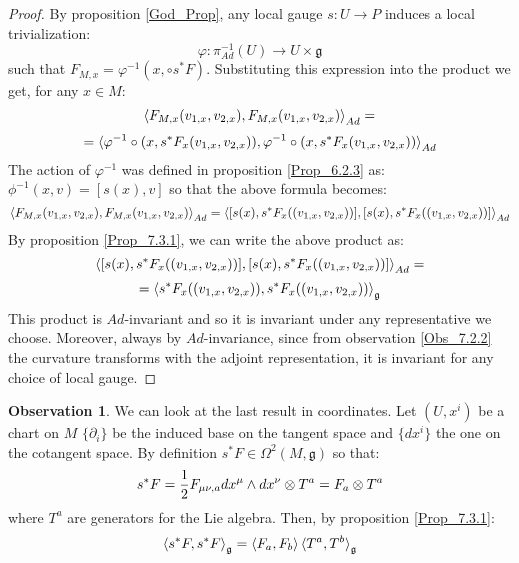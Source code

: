 \documentclass[12pt,a4paper]{report}
\theoremstyle{definition}
\theoremstyle{Theorem}
\theoremstyle{definition}
\theoremstyle{definition}
\newtheorem{Obs}[Def]{Observation}
\begin{document}
	\begin{proof}
		By proposition \ref{God_Prop}, any local gauge $s:U\rightarrow P$ induces a local trivialization:
		$$\varphi: \pi^{-1}_{Ad}(U)\rightarrow U\times \mathfrak{g}$$
		such that $F_{M,x}=\varphi^{-1}(x,\circ s^*F)$.
		Substituting this expression into the product we get, for any $x\in M$:
		$$\braket{F_{M,x}(v_{1,x},v_{2,x}),F_{M,x}(v_{1,x},v_{2,x})}_{Ad}=$$
		$$=\braket{\varphi^{-1}\circ (x,s^*F_x(v_{1,x},v_{2,x})),\varphi^{-1}\circ (x,s^*F_x(v_{1,x},v_{2,x}))}_{Ad}$$
		The action of $\varphi^{-1}$ was defined in proposition \ref{Prop_6.2.3} as: $\phi^{-1}(x,v)=[s(x),v]$ so that the above formula becomes:
		$$\braket{F_{M,x}(v_{1,x},v_{2,x}),F_{M,x}(v_{1,x},v_{2,x})}_{Ad}=\braket{[s(x),s^*F_x((v_{1,x},v_{2,x}))],[s(x),s^*F_x((v_{1,x},v_{2,x}))]}_{Ad}$$
		By proposition \ref{Prop_7.3.1}, we can write the above product as:
		$$\braket{[s(x),s^*F_x((v_{1,x},v_{2,x}))],[s(x),s^*F_x((v_{1,x},v_{2,x}))]}_{Ad}=$$
		$$=\braket{s^*F_x((v_{1,x},v_{2,x})),s^*F_x((v_{1,x},v_{2,x}))}_\mathfrak{g}$$
		This product is $Ad$-invariant and so it is invariant under any representative we choose. Moreover, always by $Ad$-invariance, since from observation \ref{Obs_7.2.2} the curvature transforms with the adjoint representation, it is invariant for any choice of local gauge.
	\end{proof}
	\begin{Obs}\label{Obs_7.3.2}
		We can look at the last result in coordinates. Let $(U,x^i)$ be a chart on $M$ $\{\partial_i\}$ be the induced base on the tangent space and $\{dx^i\}$ the one on the cotangent space. By definition $s^*F\in \Omega^2(M,\mathfrak{g})$ so that:
		$$s^*F={1\over 2}F_{\mu\nu,a}dx^\mu\wedge dx^\nu\otimes T^a=F_a\otimes T^a$$
		where $T^a$ are generators for the Lie algebra. Then, by proposition \ref{Prop_7.3.1}:
		$$\braket{s^*F,s^*F}_\mathfrak{g}=\braket{F_a,F_b}\braket{T^a,T^b}_\mathfrak{g}$$
	\end{Obs}
\end{document}
